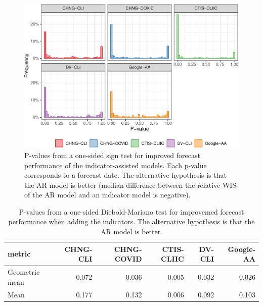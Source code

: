\begin{figure}

{\centering \includegraphics[width=\textwidth]{fig/sign-test-1} 

}

\caption{P-values from a one-sided sign test for improved forecast performance of the indicator-assisted models. Each p-value corresponds to a forecast date. The alternative hypothesis is that the AR model is better (median difference between the relative WIS of the AR model and an indicator model is negative).}\label{fig:sign-test}
\end{figure}

\begin{table}

\caption{\label{tab:dm-test}P-values from a one-sided Diebold-Mariano test for improvemed forecast performance when adding the indicators. The alternative hypothesis is that the AR model is better.}
\centering
\begin{tabular}[t]{lrrrrr}
\toprule
metric & CHNG-CLI & CHNG-COVID & CTIS-CLIIC & DV-CLI & Google-AA\\
\midrule
Geometric mean & 0.072 & 0.036 & 0.005 & 0.032 & 0.026\\
Mean & 0.177 & 0.132 & 0.006 & 0.092 & 0.103\\
\bottomrule
\end{tabular}
\end{table}

